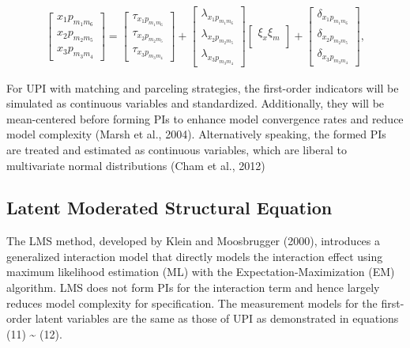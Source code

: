 \documentclass[
  11pt,
  man]{apa6}
\begin{document}
\begin{align}
    \begin{bmatrix}
        x_{1}p_{m_{1}m_{6}} \\
        x_{2}p_{m_{2}m_{5}} \\ 
        x_{3}p_{m_{3}m_{4}}
    \end{bmatrix} =
    \begin{bmatrix}
        \tau_{x_{1}p_{m_{1}m_{6}}} \\
        \tau_{x_{2}p_{m_{2}m_{5}}} \\ 
        \tau_{x_{3}p_{m_{3}m_{4}}}
    \end{bmatrix} +
    \begin{bmatrix}
        \lambda_{x_{1}p_{m_{1}m_{6}}} \\
        \lambda_{x_{2}p_{m_{2}m_{5}}} \\ 
        \lambda_{x_{3}p_{m_{3}m_{4}}}
    \end{bmatrix}
    \begin{bmatrix}
        \xi_{x}\xi_{m} \\
    \end{bmatrix} +
    \begin{bmatrix}
        \delta_{x_{1}p_{m_{1}m_{6}}} \\
        \delta_{x_{2}p_{m_{2}m_{5}}} \\ 
        \delta_{x_{3}p_{m_{3}m_{4}}}
    \end{bmatrix},
\end{align}

For UPI with matching and parceling strategies, the first-order indicators will be simulated as continuous variables and standardized. Additionally, they will be mean-centered before forming PIs to enhance model convergence rates and reduce model complexity (Marsh et al., 2004). Alternatively speaking, the formed PIs are treated and estimated as continuous variables, which are liberal to multivariate normal distributions (Cham et al., 2012)

\hypertarget{latent-moderated-structural-equation}{%
\subsection{Latent Moderated Structural Equation}\label{latent-moderated-structural-equation}}

The LMS method, developed by Klein and Moosbrugger (2000), introduces a generalized interaction model that directly models the interaction effect using maximum likelihood estimation (ML) with the Expectation-Maximization (EM) algorithm. LMS does not form PIs for the interaction term and hence largely reduces model complexity for specification. The measurement models for the first-order latent variables are the same as those of UPI as demonstrated in equations (11) \textasciitilde{} (12).
\end{document}
